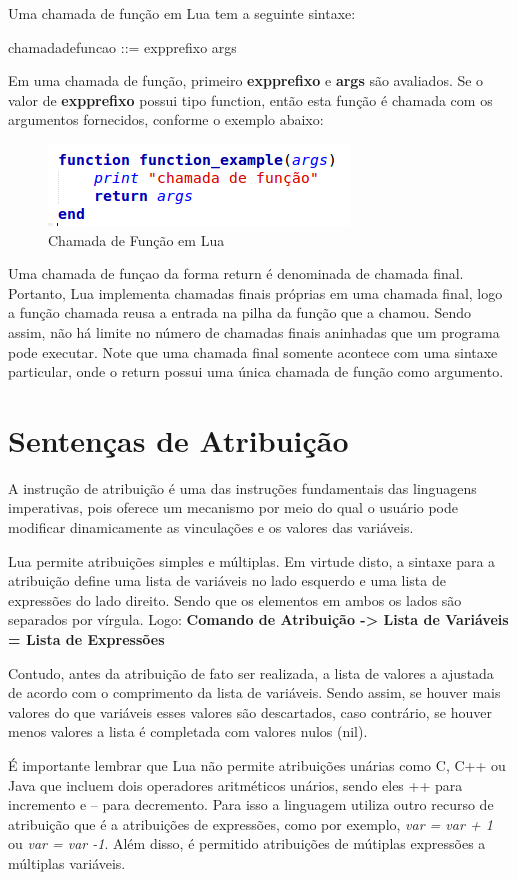 \documentclass[
12pt, %
openright, %
oneside, %
a4paper, %
english, %
brazil, %
]{abntex2}
\begin{document}
Uma chamada de função em Lua tem a seguinte sintaxe:

  chamadadefuncao ::= expprefixo args

Em uma chamada de função, primeiro \textbf{expprefixo} e \textbf{args} são avaliados. Se o valor de \textbf{expprefixo} possui tipo function, então esta função é chamada com os argumentos fornecidos, conforme o exemplo abaixo:

\begin{figure}[H]
\centering
\includegraphics[width=0.5\linewidth]{imagens/function.png}
\caption{Chamada de Função em Lua}
\end{figure}

Uma chamada de funçao da forma return é denominada de chamada final. Portanto, Lua implementa chamadas finais próprias em uma chamada final, logo a função chamada reusa a entrada na pilha da função que a chamou. Sendo assim, não há limite no número de chamadas finais aninhadas que um programa pode executar. Note que uma chamada final somente acontece com uma sintaxe particular, onde o return possui uma única chamada de função como argumento.

\chapter{Sentenças de Atribuição}
A instrução de atribuição é uma das instruções fundamentais das linguagens imperativas, pois oferece um mecanismo por meio do qual o usuário pode modificar dinamicamente as vinculações e os valores das variáveis.

Lua permite atribuições simples e múltiplas. Em virtude disto, a sintaxe para a atribuição define uma lista de variáveis no lado esquerdo e uma lista de expressões do lado direito. Sendo que os elementos em ambos os lados são separados por vírgula. Logo:
\textbf{Comando de Atribuição -> Lista de Variáveis = Lista de Expressões}

Contudo, antes da atribuição de fato ser realizada, a lista de valores a ajustada de acordo com o comprimento da lista de variáveis. Sendo assim, se houver mais valores do que variáveis esses valores são descartados, caso contrário, se houver menos valores a lista é completada com valores nulos (nil).

É importante lembrar que Lua não permite atribuições unárias como C, C++ ou Java que incluem dois operadores aritméticos unários, sendo eles ++ para incremento e -- para decremento. Para isso a linguagem utiliza outro recurso de atribuição que é a atribuições de expressões, como por exemplo, \textit{var = var + 1} ou \textit{var = var -1}. Além disso, é permitido atribuições de mútiplas expressões a múltiplas variáveis.
\end{document}
